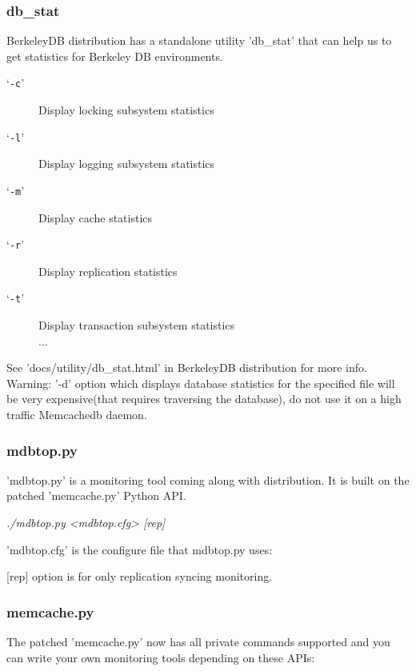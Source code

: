 \documentclass{beamer}
\newcommand{\filenamew}[1]{{{\textit{\begingroup \urlstyle{sf}\Url{#1}}}}}
\newcommand{\command}[1]{`\texttt{#1}'}
\begin{document}
\begin{frame}
\frametitle{db\_stat}
BerkeleyDB distribution has a standalone utility 'db\_stat' that can help us
 to get statistics for Berkeley DB environments.
\begin{description}
\item[\command{-c}]
Display locking subsystem statistics
\item[\command{-l}]
Display logging subsystem statistics
\item[\command{-m}]
Display cache statistics
\item[\command{-r}]
Display replication statistics
\item[\command{-t}]
Display transaction subsystem statistics\\
...
\end{description}
See 'docs/utility/db\_stat.html' in BerkeleyDB distribution for more info.\\
\alert{Warning:} '-d' option which displays database statistics for the specified file will be very expensive(that requires traversing the database), do not use it on a high traffic Memcachedb daemon.
\end{frame}

\begin{frame}[fragile]
\frametitle{mdbtop.py}
'mdbtop.py' is a monitoring tool coming along with distribution. 
It is built on the patched 'memcache.py' Python API. 
\begin{block}{}
\begin{semiverbatim}
 \textit{./mdbtop.py <mdbtop.cfg> [rep]}
\end{semiverbatim}
\end{block}
'mdbtop.cfg' is the configure file that mdbtop.py uses:

[rep] option is for only replication syncing monitoring.
\end{frame}

\begin{frame}[fragile]
\frametitle{memcache.py}
The patched 'memcache.py' now has all private commands supported and
 you can write your own monitoring tools depending on these APIs:
\end{frame}
\end{document}

